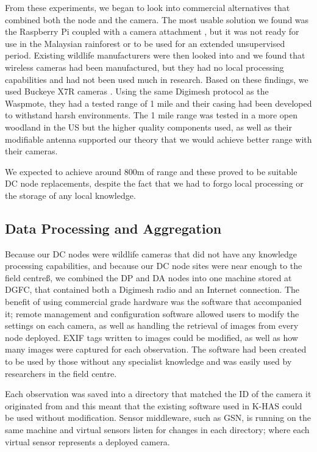 				From these experiments, we began to look into commercial alternatives that combined both the node and the camera. The most usable solution we found was the Raspberry Pi coupled with a camera attachment \cite{Sarajevo2014}, but it was not ready for use in the Malaysian rainforest or to be used for an extended unsupervised period. Existing wildlife manufacturers were then looked into and we found that wireless cameras had been manufactured, but they had no local processing capabilities and had not been used much in research. Based on these findings, we used Buckeye X7R cameras \cite{Buckeye}. Using the same Digimesh protocol as the Waspmote, they had a tested range of 1 mile and their casing had been developed to withstand harsh environments. The 1 mile range was tested in a more open woodland in the US but the higher quality components used, as well as their modifiable antenna supported our theory that we would achieve better range with their cameras.
				
				We expected to achieve around 800m of range and these proved to be suitable DC node replacements, despite the fact that we had to forgo local processing or the storage of any local knowledge.
		\subsection{Data Processing and Aggregation}
				Because our DC nodes were wildlife cameras that did not have any knowledge processing capabilities, and because our DC node sites were near enough to the field centreß, we combined the DP and DA nodes into one machine stored at DGFC, that contained both a Digimesh radio and an Internet connection. The benefit of using commercial grade hardware was the software that accompanied it; remote management and configuration software allowed users to modify the settings on each camera, as well as handling the retrieval of images from every node deployed. EXIF tags written to images could be modified, as well as how many images were captured for each observation. The software had been created to be used by those without any specialist knowledge and was easily used by researchers in the field centre.
				
				Each observation was saved into a directory that matched the ID of the camera it originated from and this meant that the existing software used in K-HAS could be used without modification. Sensor middleware, such as GSN, is running on the same machine and virtual sensors listen for changes in each directory; where each virtual sensor represents a deployed camera.
				
